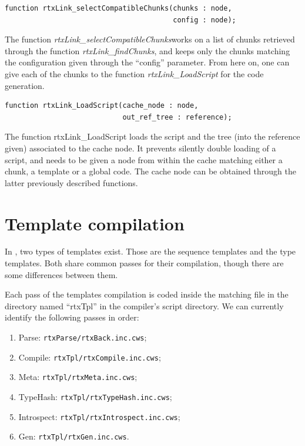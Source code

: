 \documentclass[american]{rtxreport}
\begin{document}
\begin{lstlisting}
function rtxLink_selectCompatibleChunks(chunks : node,
                                        config : node);
\end{lstlisting} The function \emph{rtxLink\_selectCompatibleChunks}works on a
list of chunks retrieved through the function \emph{rtxLink\_findChunks}, and
keeps only the chunks matching the configuration given through the ``config''
parameter. From here on, one can give each of the chunks to the function
\emph{rtxLink\_LoadScript} for the code generation.


\begin{lstlisting}
function rtxLink_LoadScript(cache_node : node,
                            out_ref_tree : reference);
\end{lstlisting}
The function rtxLink\_LoadScript loads the script and the tree (into the
reference given) associated to the cache node. It prevents silently double
loading of a script, and needs to be given a node from within the cache
matching either a chunk, a template or a global code. The cache node can be
obtained through the latter previously described functions.




%
%

\section{Template compilation}

In \rtx, two types of templates exist. Those are the sequence templates and the
type templates. Both share common passes for their compilation, though there
are some differences between them.

Each pass of the templates compilation is coded inside the matching file in the
directory named ``rtxTpl'' in the compiler's script directory. We can currently
identify the following passes in order:
\begin{enumerate}
    \item Parse: \texttt{rtxParse/rtxBack.inc.cws};
    \item Compile: \texttt{rtxTpl/rtxCompile.inc.cws};
    \item Meta: \texttt{rtxTpl/rtxMeta.inc.cws};
    \item TypeHash: \texttt{rtxTpl/rtxTypeHash.inc.cws};
    \item Introspect: \texttt{rtxTpl/rtxIntrospect.inc.cws};
    \item Gen: \texttt{rtxTpl/rtxGen.inc.cws}.
\end{enumerate}
\end{document}
